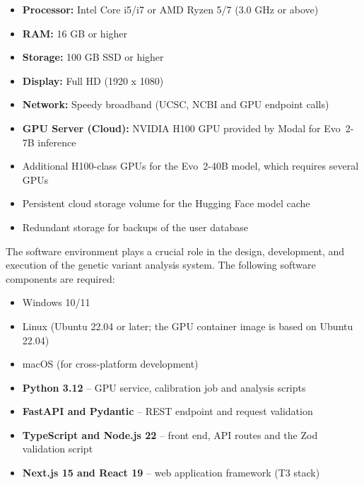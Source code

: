 \begin{itemize}
\item \textbf{Processor:} Intel Core i5/i7 or AMD Ryzen 5/7 (3.0 GHz or above)
\item \textbf{RAM:} 16 GB or higher
\item \textbf{Storage:} 100 GB SSD or higher
\item \textbf{Display:} Full HD (1920 x 1080)
\item \textbf{Network:} Speedy broadband (UCSC, NCBI and GPU endpoint calls)
\item \textbf{GPU Server (Cloud):} NVIDIA H100 GPU provided by Modal for Evo~2-7B inference
\end{itemize}

\vspace{4pt}
\begin{itemize}
\item Additional H100-class GPUs for the Evo~2-40B model, which requires several GPUs
\item Persistent cloud storage volume for the Hugging Face model cache
\item Redundant storage for backups of the user database
\end{itemize}

The software environment plays a crucial role in the design, development, and execution of the genetic variant analysis system. The following software components are required:

\vspace{4pt}
\begin{itemize}
\item Windows 10/11
\item Linux (Ubuntu 22.04 or later; the GPU container image is based on Ubuntu 22.04)
\item macOS (for cross-platform development)
\end{itemize}

\vspace{4pt}
\begin{itemize}
\item \textbf{Python 3.12} -- GPU service, calibration job and analysis scripts
\item \textbf{FastAPI and Pydantic} -- REST endpoint and request validation
\item \textbf{TypeScript and Node.js 22} -- front end, API routes and the Zod validation script
\item \textbf{Next.js 15 and React 19} -- web application framework (T3 stack)
\end{itemize}

